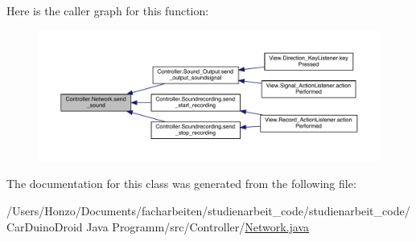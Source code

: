 Here is the caller graph for this function\+:
\nopagebreak
\begin{figure}[H]
\begin{center}
\leavevmode
\includegraphics[width=350pt]{class_controller_1_1_network_a0cd2bef3e6087ab3ab39d28b4a57db35_icgraph}
\end{center}
\end{figure}




The documentation for this class was generated from the following file\+:\begin{DoxyCompactItemize}
\item 
/\+Users/\+Honzo/\+Documents/facharbeiten/studienarbeit\+\_\+code/studienarbeit\+\_\+code/\+Car\+Duino\+Droid Java Programm/src/\+Controller/\hyperlink{_network_8java}{Network.\+java}\end{DoxyCompactItemize}
